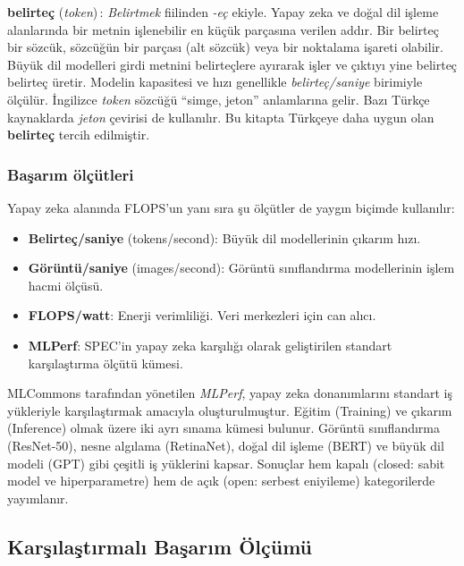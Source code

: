 \begin{terimnotu}
\textbf{belirteç} (\emph{token})\,: \emph{Belirtmek} fiilinden \emph{-eç} ekiyle. Yapay zeka ve doğal dil işleme alanlarında bir metnin işlenebilir en küçük parçasına verilen addır. Bir belirteç bir sözcük, sözcüğün bir parçası (alt sözcük) veya bir noktalama işareti olabilir. Büyük dil modelleri girdi metnini belirteçlere ayırarak işler ve çıktıyı yine belirteç belirteç üretir. Modelin kapasitesi ve hızı genellikle \emph{belirteç/saniye} birimiyle ölçülür. İngilizce \emph{token} sözcüğü ``simge, jeton'' anlamlarına gelir. Bazı Türkçe kaynaklarda \emph{jeton} çevirisi de kullanılır. Bu kitapta Türkçeye daha uygun olan \textbf{belirteç} tercih edilmiştir.
\end{terimnotu}

\subsubsection*{Başarım ölçütleri}
Yapay zeka alanında FLOPS'un yanı sıra şu ölçütler de yaygın biçimde kullanılır:
\begin{itemize}
    \item \textbf{Belirteç/saniye} (tokens/second): Büyük dil modellerinin çıkarım hızı.
    \item \textbf{Görüntü/saniye} (images/second): Görüntü sınıflandırma modellerinin işlem hacmi ölçüsü.
    \item \textbf{FLOPS/watt}: Enerji verimliliği. Veri merkezleri için can alıcı.
    \item \textbf{MLPerf}: SPEC'in yapay zeka karşılığı olarak geliştirilen standart karşılaştırma ölçütü kümesi.
\end{itemize}

\begin{bilginot}\label{bn:mlperf}
MLCommons tarafından yönetilen \emph{MLPerf}, yapay zeka donanımlarını standart iş yükleriyle karşılaştırmak amacıyla oluşturulmuştur. Eğitim (Training) ve çıkarım (Inference) olmak üzere iki ayrı sınama kümesi bulunur. Görüntü sınıflandırma (ResNet-50), nesne algılama (RetinaNet), doğal dil işleme (BERT) ve büyük dil modeli (GPT) gibi çeşitli iş yüklerini kapsar. Sonuçlar hem kapalı (closed: sabit model ve hiperparametre) hem de açık (open: serbest eniyileme) kategorilerde yayımlanır.
\end{bilginot}


\subsection{Karşılaştırmalı Başarım Ölçümü}
\label{subsec:karsilastirmali-basarim}

